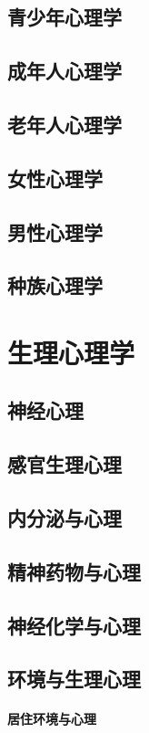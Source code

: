 \documentclass[UTF8]{../RepresentationUniverse}
\begin{document}
\section{青少年心理学}
\section{成年人心理学}
\section{老年人心理学}
\section{女性心理学}
\section{男性心理学}
\section{种族心理学}


\chapter{生理心理学}
    \section{神经心理}
    \section{感官生理心理}
    \section{内分泌与心理}
    \section{精神药物与心理}
    \section{神经化学与心理}
    \section{环境与生理心理}
        \subsubsection{居住环境与心理}
\end{document}
